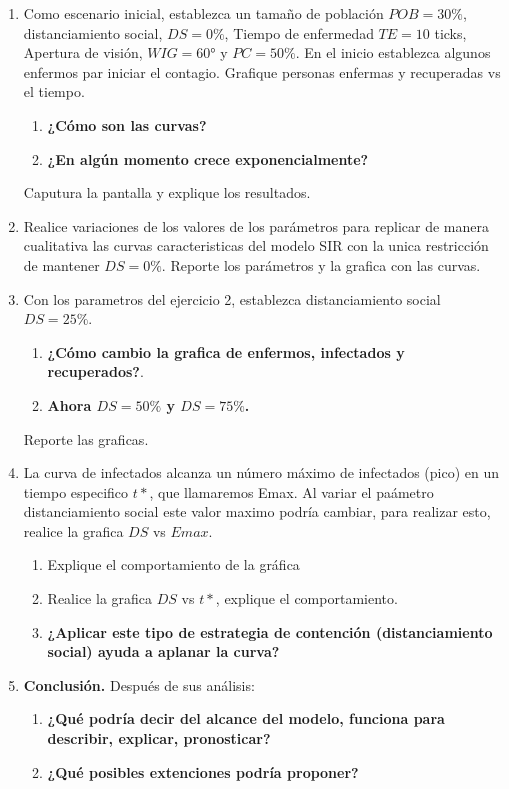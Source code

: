 \documentclass[12pt]{article}
\begin{document}
\begin{enumerate}
    \item Como escenario inicial, establezca un tamaño de población $POB=30\%$, distanciamiento social, $DS=0\%$, Tiempo de enfermedad $TE=10$ ticks, Apertura de visión, $WIG=60$° y $PC=50\%$. En el inicio establezca algunos enfermos par iniciar el contagio.
    Grafique personas enfermas y recuperadas vs  el tiempo.\\
    \begin{enumerate}
    \item \textbf{¿Cómo son las curvas?}
    \item \textbf{¿En algún momento crece exponencialmente?}
    \end{enumerate}
    Caputura la pantalla y explique los resultados.


    \item Realice variaciones de los valores de los parámetros para replicar de manera cualitativa las curvas caracteristicas del modelo SIR con la unica restricción de mantener $DS=0\%$.
    Reporte los parámetros y la grafica con las curvas.
    
    \item Con los parametros del ejercicio 2, establezca distanciamiento social $DS=25\%$.
    \begin{enumerate}
        \item \textbf{¿Cómo cambio la grafica de enfermos, infectados y recuperados?}.
        \item \textbf{Ahora $DS=50\%$ y $DS=75\%$.}
    \end{enumerate}
    Reporte las graficas.

    \item La curva de infectados alcanza un número máximo de infectados (pico) en un tiempo especifico $t*$, que llamaremos Emax.
    Al variar el paámetro distanciamiento social este valor maximo podría cambiar, para realizar esto, realice la grafica $DS$ vs $Emax$.
    \begin{enumerate}
        \item Explique el comportamiento de la gráfica
        \item Realice la grafica $DS$ vs $t*$, explique el comportamiento.
        \item \textbf{¿Aplicar este tipo de estrategia de contención (distanciamiento social) ayuda a aplanar la curva?}
    \end{enumerate}

    \item \textbf{Conclusión.} Después de sus análisis: 
    \begin{enumerate}
        \item \textbf{¿Qué podría decir del alcance del modelo, funciona para describir, explicar, pronosticar?}
        \item \textbf{¿Qué posibles extenciones podría proponer?}
    \end{enumerate}

\end{enumerate}
\end{document}
